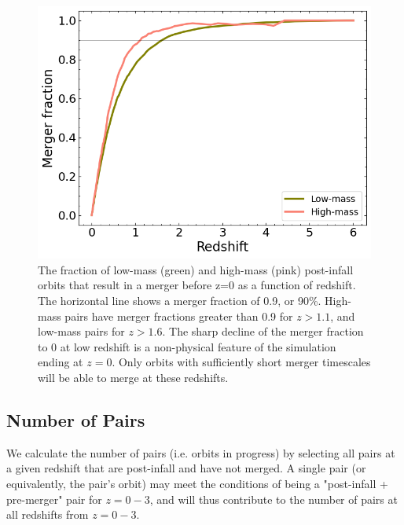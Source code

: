 \documentclass[twocolumn,linenumbers]{aastex631}
\begin{document}
\begin{figure}[htb]
    \begin{center}
    \includegraphics[width=\columnwidth]{plots/bet-on-it/6_mergerfraction.png}
    \caption{The fraction of low-mass (green) and high-mass (pink) post-infall orbits that result in a merger before z=0 as a function of redshift. 
    The horizontal line shows a merger fraction of 0.9, or 90\%. 
    High-mass pairs have merger fractions greater than 0.9 for $z>1.1$, and low-mass pairs for $z>1.6$.
    The sharp decline of the merger fraction to 0 at low redshift is a non-physical feature of the simulation ending at $z=0$.
    Only orbits with sufficiently short merger timescales will be able to merge at these redshifts.}
    \label{fig:fmerge}
    \end{center}
\end{figure}

\subsection{Number of Pairs}
We calculate the number of pairs (i.e. orbits in progress) by selecting all pairs at a given redshift that are post-infall and have not merged.
A single pair (or equivalently, the pair's orbit) may meet the conditions of being a "post-infall + pre-merger" pair for $z=0-3$, and will thus contribute to the number of pairs at all redshifts from $z=0-3$. 
\end{document}
